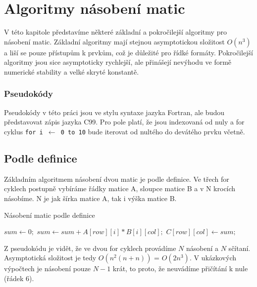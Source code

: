 \chapter{Algoritmy násobení matic}

V této kapitole představíme některé základní a pokročilejší algoritmy pro násobení matic. Základní algoritmy mají stejnou asymptotickou složitost $O(n^3)$ a liší se pouze přístupům k prvkům, což je důležité pro řídké formáty. Pokročilejší algoritmy jsou sice asymptoticky rychlejší, ale přinášejí nevýhodu ve formě numerické stability a velké skryté konstantě.

\subsection{Pseudokódy}

Pseudokódy v této práci jsou ve stylu syntaxe jazyka Fortran, ale budou představovat zápis jazyka C99. Pro pole platí, že jsou indexovaná od nuly a for cyklus \texttt{for i $\gets$ 0 to 10} bude iterovat od nultého do devátého prvku včetně.

\section{Podle definice}

Základním algoritmem násobení dvou matic je podle definice. Ve třech for cyklech postupně  vybíráme řádky matice A, sloupce matice B a v N krocích násobíme. N je jak šírka matice A, tak i výška matice B.

\begin{algorithm}[H]
	\caption{Násobení matic podle definice}\label{mmm-by-definiton}
	\begin{algorithmic}[1]
		\State \texttt{$sum \gets 0;$}
			\State \texttt{$sum \gets sum + A[row][i] * B[i][col];$}
		\EndFor
		\State \texttt{$C[row][col] \gets sum;$}
	\EndFor
\EndFor
		\EndProcedure
	\end{algorithmic}
\end{algorithm}

Z pseudokódu je vidět, že ve dvou for cyklech provádíme $N$ násobení a $N$ sčítaní. Asymptotická složitost je tedy $O(n^2(n + n))$ = $O(2n^3)$. V ukázkových výpočtech je násobení pouze $N-1$ krát, to proto, že neuvádíme přičítání k nule (řádek 6).

